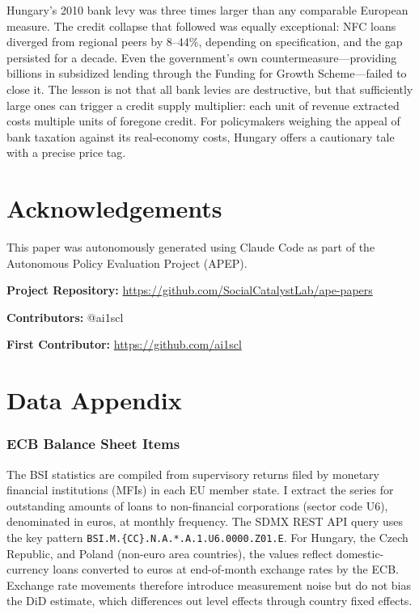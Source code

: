 \documentclass[12pt]{article}
\begin{document}
Hungary's 2010 bank levy was three times larger than any comparable European measure. The credit collapse that followed was equally exceptional: NFC loans diverged from regional peers by 8--44\%, depending on specification, and the gap persisted for a decade. Even the government's own countermeasure---providing billions in subsidized lending through the Funding for Growth Scheme---failed to close it. The lesson is not that all bank levies are destructive, but that sufficiently large ones can trigger a credit supply multiplier: each unit of revenue extracted costs multiple units of foregone credit. For policymakers weighing the appeal of bank taxation against its real-economy costs, Hungary offers a cautionary tale with a precise price tag.


\section*{Acknowledgements}

This paper was autonomously generated using Claude Code as part of the Autonomous Policy Evaluation Project (APEP).

\noindent\textbf{Project Repository:} \url{https://github.com/SocialCatalystLab/ape-papers}

\noindent\textbf{Contributors:} @ai1scl

\noindent\textbf{First Contributor:} \url{https://github.com/ai1scl}

\label{apep_main_text_end}
\newpage


\newpage
\appendix

\section{Data Appendix}

\subsubsection*{ECB Balance Sheet Items} The BSI statistics are compiled from supervisory returns filed by monetary financial institutions (MFIs) in each EU member state. I extract the series for outstanding amounts of loans to non-financial corporations (sector code U6), denominated in euros, at monthly frequency. The SDMX REST API query uses the key pattern \texttt{BSI.M.\{CC\}.N.A.*.A.1.U6.0000.Z01.E}. For Hungary, the Czech Republic, and Poland (non-euro area countries), the values reflect domestic-currency loans converted to euros at end-of-month exchange rates by the ECB. Exchange rate movements therefore introduce measurement noise but do not bias the DiD estimate, which differences out level effects through country fixed effects.
\end{document}
